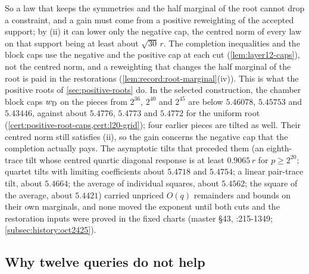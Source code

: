 So a law that keeps the symmetries and the half marginal of the root cannot drop
a constraint, and a gain must come from a positive reweighting of the accepted
support; by (ii) it can lower only the negative cap, the centred norm of every
law on that support being at least about $\sqrt{30}\,r$. The completion
inequalities and the block caps use the negative
and the positive cap at each cut (\cref{lem:layer12-caps}), not the centred
norm, and a reweighting that changes the half marginal of the root is paid in
the restorations (\cref{lem:record:root-marginal}(iv)). This is what the
positive roots of \cref{sec:positive-roots} do. In the selected construction,
the chamber block caps $w_{\rm D}$ on the pieces from $2^{36}$, $2^{40}$ and
$2^{45}$ are below $5.46078$, $5.45753$ and $5.43446$, against about
$5.4776$, $5.4773$ and $5.4772$ for the uniform root
(\cref{cert:positive-root-caps,cert:l20-grid}); four earlier pieces are tilted
as well. Their centred norm still satisfies (ii), so the gain concerns the
negative cap that the completion actually pays. The asymptotic tilts
that preceded them (an eighth-trace tilt whose centred quartic diagonal response
is at least $0.9065\,r$ for $p\ge2^{20}$; quartet tilts with limiting
coefficients about $5.4718$ and $5.4754$; a linear pair-trace tilt, about
$5.4664$; the average of individual squares, about $5.4562$; the square of the
average, about $5.4421$) carried unpriced $O(q)$ remainders and bounds on their
own marginals, and none moved the exponent until both cuts and the restoration
inputs were proved in the fixed charts (master \S43,
:215-1349;
\cref{subsec:history:oct2425}).

\subsection{Why twelve queries do not help}\label{subsec:obs:twelve}

